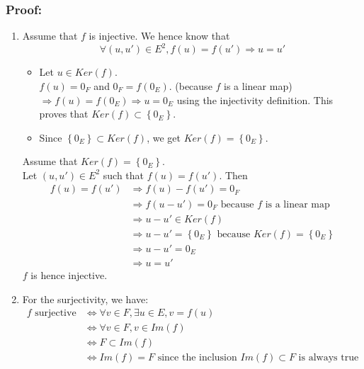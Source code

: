 \documentclass[notitlepage]{math}
\begin{document}
\subsubsection{Proof:}
\begin{enumerate}
    \item \fbox{$\Longrightarrow$} Assume that $f$ is injective. We hence know that
    \[ \forall (u, u') \in E ^2, f(u) = f(u') \Rightarrow u = u'\]
    \begin{itemize}
        \item Let $u \in Ker(f)$. \\
        $f(u) = 0_F$ and $0_F = f(0_E)$. (because $f$ is a linear map) $\Rightarrow f(u) = f(0_E) \Rightarrow u = 0_E$ using the injectivity definition.
        This proves that $Ker(f) \subset \left\{ 0_E \right\}$.
        \item Since $\left\{ 0_E \right\} \subset Ker(f)$, we get $Ker(f) = \left\{ 0_E \right\}$.
    \end{itemize}
    \fbox{$\Longleftarrow$} Assume that $Ker(f) = \left\{ 0_E \right\}$. \\
    Let $(u, u') \in E ^2$ such that $f(u) = f(u')$. Then
    \begin{align*}
        f(u) = f(u') &\Rightarrow f(u) - f(u') = 0_F \\
        &\Rightarrow f(u - u') = 0_F \text{ because } f \text{ is a linear map} \\
        &\Rightarrow u - u' \in Ker(f)\\
        &\Rightarrow u - u' = \left\{ 0_E \right\} \text{ because } Ker(f) = \left\{ 0_E \right\} \\
        &\Rightarrow u - u' = 0_E \\
        &\Rightarrow u = u' 
    \end{align*}
    $f$ is hence injective.
    \item For the surjectivity, we have:
    \begin{align*}
        f \text{ surjective} &\Longleftrightarrow \forall v \in F, \exists u \in E, v = f(u) \\
        &\Longleftrightarrow \forall v \in F, v \in Im(f) \\
        &\Longleftrightarrow F \subset Im(f) \\
        &\Longleftrightarrow Im(f) = F \text{ since the inclusion } Im(f) \subset F \text{ is always true}
    \end{align*}
\end{enumerate}
\end{document}
